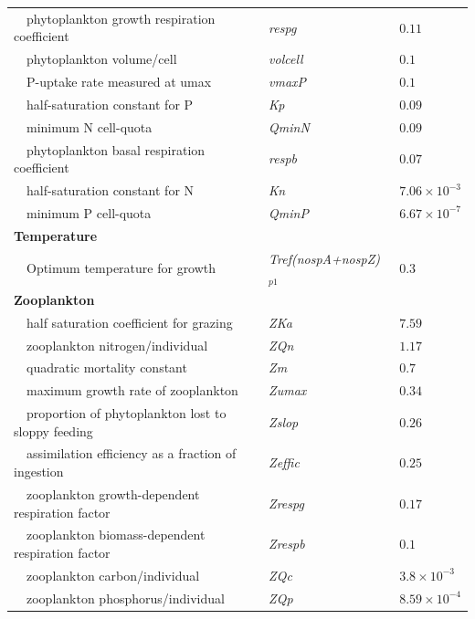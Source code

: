 \documentclass[review]{elsarticle}\usepackage[]{graphicx}\usepackage[]{color}
\begin{document}
\begin{table}[!tbp]
{\begin{center}
\begin{tabular}{lll}
~~phytoplankton growth respiration coefficient&\textit{respg}&$0.11$\tabularnewline
~~phytoplankton volume/cell&\textit{volcell}&$0.1$\tabularnewline
~~P-uptake rate measured at umax&\textit{vmaxP}&$0.1$\tabularnewline
~~half-saturation constant for P&\textit{Kp}&$0.09$\tabularnewline
~~minimum N cell-quota&\textit{QminN}&$0.09$\tabularnewline
~~phytoplankton basal respiration coefficient&\textit{respb}&$0.07$\tabularnewline
~~half-saturation constant for N&\textit{Kn}&$7.06\times 10^{-3}$\tabularnewline
~~minimum P cell-quota&\textit{QminP}&$6.67\times 10^{-7}$\tabularnewline
\hline
{\bfseries Temperature}&&\tabularnewline
~~Optimum temperature for growth&\textit{Tref(nospA+nospZ)$_{p1}$}&$0.3$\tabularnewline
\hline
{\bfseries Zooplankton}&&\tabularnewline
~~half saturation coefficient for grazing&\textit{ZKa}&$7.59$\tabularnewline
~~zooplankton nitrogen/individual&\textit{ZQn}&$1.17$\tabularnewline
~~quadratic mortality constant&\textit{Zm}&$0.7$\tabularnewline
~~maximum growth rate of zooplankton&\textit{Zumax}&$0.34$\tabularnewline
~~proportion of phytoplankton lost to sloppy feeding&\textit{Zslop}&$0.26$\tabularnewline
~~assimilation efficiency as a fraction of ingestion&\textit{Zeffic}&$0.25$\tabularnewline
~~zooplankton growth-dependent respiration factor&\textit{Zrespg}&$0.17$\tabularnewline
~~zooplankton biomass-dependent respiration factor&\textit{Zrespb}&$0.1$\tabularnewline
~~zooplankton carbon/individual&\textit{ZQc}&$3.8\times 10^{-3}$\tabularnewline
~~zooplankton phosphorus/individual&\textit{ZQp}&$8.59\times 10^{-4}$\tabularnewline
\hline
\end{tabular}\end{center}}
\end{table}
\end{document}
